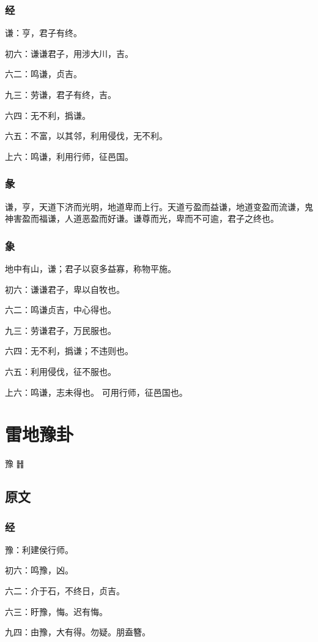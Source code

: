 \documentclass[12pt,oneside]{book}
\begin{document}
\subsection{经}
谦：亨，君子有终。

初六：谦谦君子，用涉大川，吉。

六二：鸣谦，贞吉。

九三：劳谦，君子有终，吉。

六四：无不利，撝谦。

六五：不富，以其邻，利用侵伐，无不利。

上六：鸣谦，利用行师，征邑国。

\subsection{彖}
谦，亨，天道下济而光明，地道卑而上行。天道亏盈而益谦，地道变盈而流谦，鬼神害盈而福谦，人道恶盈而好谦。谦尊而光，卑而不可逾，君子之终也。

\subsection{象}
地中有山，谦；君子以裒多益寡，称物平施。

初六：谦谦君子，卑以自牧也。

六二：鸣谦贞吉，中心得也。

九三：劳谦君子，万民服也。

六四：无不利，撝谦；不违则也。

六五：利用侵伐，征不服也。

上六：鸣谦，志未得也。 可用行师，征邑国也。


\chapter{雷地豫卦}
豫 {\Large ䷏}

\section{原文}

\subsection{经}
豫：利建侯行师。

初六：鸣豫，凶。

六二：介于石，不终日，贞吉。

六三：盱豫，悔。迟有悔。

九四：由豫，大有得。勿疑。朋盍簪。
\end{document}
